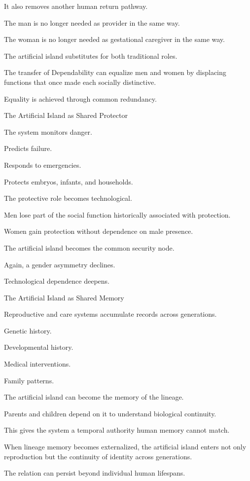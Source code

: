 It also removes another human return pathway.

The man is no longer needed as provider in the same way.

The woman is no longer needed as gestational caregiver in the same way.

The artificial island substitutes for both traditional roles.

The transfer of Dependability can equalize men and women by displacing functions that once made each socially distinctive.

Equality is achieved through common redundancy.

The Artificial Island as Shared Protector

The system monitors danger.

Predicts failure.

Responds to emergencies.

Protects embryos, infants, and households.

The protective role becomes technological.

Men lose part of the social function historically associated with protection.

Women gain protection without dependence on male presence.

The artificial island becomes the common security node.

Again, a gender asymmetry declines.

Technological dependence deepens.

The Artificial Island as Shared Memory

Reproductive and care systems accumulate records across generations.

Genetic history.

Developmental history.

Medical interventions.

Family patterns.

The artificial island can become the memory of the lineage.

Parents and children depend on it to understand biological continuity.

This gives the system a temporal authority human memory cannot match.

When lineage memory becomes externalized, the artificial island enters not only reproduction but the continuity of identity across generations.

The relation can persist beyond individual human lifespans.

